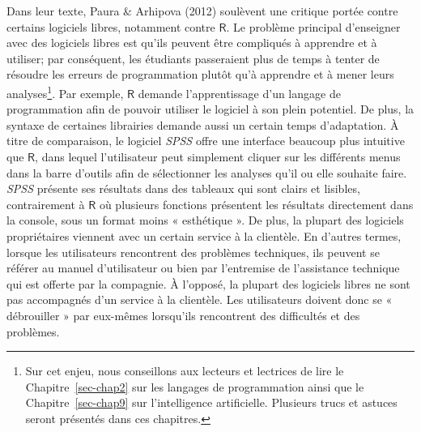 \documentclass[
  letterpaper,
  DIV=11,
  numbers=noendperiod,
  oneside]{scrreprt}
\begin{document}
Dans leur texte, Paura \& Arhipova (2012) soulèvent une critique portée
contre certains logiciels libres, notamment contre \(\textsf{R}\). Le
problème principal d'enseigner avec des logiciels libres est qu'ils
peuvent être compliqués à apprendre et à utiliser; par conséquent, les
étudiants passeraient plus de temps à tenter de résoudre les erreurs de
programmation plutôt qu'à apprendre et à mener leurs
analyses\footnote{Sur cet enjeu, nous conseillons aux lecteurs et
  lectrices de lire le Chapitre~\ref{sec-chap2} sur les langages de
  programmation ainsi que le Chapitre~\ref{sec-chap9} sur l'intelligence
  artificielle. Plusieurs trucs et astuces seront présentés dans ces
  chapitres.}. Par exemple, \(\textsf{R}\) demande l'apprentissage d'un
langage de programmation afin de pouvoir utiliser le logiciel à son
plein potentiel. De plus, la syntaxe de certaines librairies demande
aussi un certain temps d'adaptation. À titre de comparaison, le logiciel
\emph{SPSS} offre une interface beaucoup plus intuitive que
\(\textsf{R}\), dans lequel l'utilisateur peut simplement cliquer sur
les différents menus dans la barre d'outils afin de sélectionner les
analyses qu'il ou elle souhaite faire. \emph{SPSS} présente ses
résultats dans des tableaux qui sont clairs et lisibles, contrairement à
\(\textsf{R}\) où plusieurs fonctions présentent les résultats
directement dans la console, sous un format moins « esthétique ». De
plus, la plupart des logiciels propriétaires viennent avec un certain
service à la clientèle. En d'autres termes, lorsque les utilisateurs
rencontrent des problèmes techniques, ils peuvent se référer au manuel
d'utilisateur ou bien par l'entremise de l'assistance technique qui est
offerte par la compagnie. À l'opposé, la plupart des logiciels libres ne
sont pas accompagnés d'un service à la clientèle. Les utilisateurs
doivent donc se « débrouiller » par eux-mêmes lorsqu'ils rencontrent des
difficultés et des problèmes.
\end{document}
